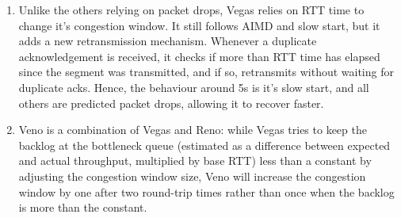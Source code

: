\documentclass[12pt]{article}
\begin{document}
\begin{enumerate}
\begin{enumerate}[label=(\alph*)]
        \item Unlike the others relying on packet drops, Vegas relies on RTT 
        time to change it's congestion window. It still follows AIMD and slow 
        start, but it adds a new retransmission mechanism. Whenever a duplicate
        acknowledgement is received, it checks if more than RTT time has elapsed 
        since the segment was transmitted, and if so, retransmits without waiting
        for duplicate acks. Hence, the behaviour around 5s is it's slow start, 
        and all others are predicted packet drops, allowing it to recover faster.
        \begin{center}
        \end{center}

        \item Veno is a combination of Vegas and Reno: while Vegas tries to keep 
            the backlog at the bottleneck queue (estimated as a difference between
            expected and actual throughput, multiplied by base RTT) less than 
            a constant by adjusting the congestion window size, Veno will increase 
            the congestion window by one after two round-trip times rather than 
            once when the backlog is more than the constant.

        \begin{center}
        \end{center}


\end{enumerate}
\end{enumerate}
\end{document}
